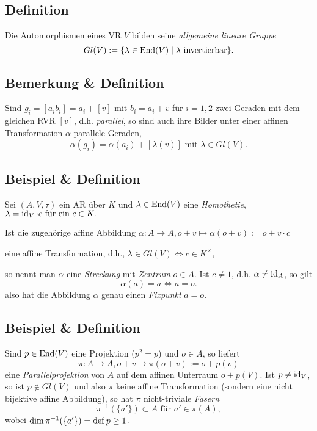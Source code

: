 \subsection{Definition}
	\begin{Definition}
	Die Automorphismen eines VR $ V $ bilden seine \emph{allgemeine lineare Gruppe}
		\[ Gl(V):= \{\lambda\in \operatorname{End}(V)\mid \lambda \text{ invertierbar}\}. \]
	\end{Definition}
\subsection{Bemerkung \& Definition}
	\begin{Definition}
	Sind $ g_i = [a_ib_i]=a_i + [v] $ mit $ b_i = a_i + v $ für $ i = 1,2 $ zwei Geraden mit dem gleichen RVR $ [v] $, d.h. \emph{parallel}, so sind auch ihre Bilder unter einer affinen Transformation $ \alpha $ parallele Geraden,
		\[ \alpha(g_i) = \alpha(a_i) + [\lambda(v)] \text{ mit } \lambda\in Gl(V). \]
	\end{Definition}
\subsection{Beispiel \& Definition}
	\begin{Definition}[Streckung]
	Sei $ (A,V,\tau) $ ein AR über $ K $ und $ \lambda\in\operatorname{End}(V) $ eine \emph{Homothetie},\hfill
		$ \lambda= \operatorname{id}_V\cdot c \text{ für ein }c\in K. $
		
	Ist die zugehörige affine Abbildung\hfill
		$ \alpha:A\to A,o+v\mapsto \alpha(o+v):= o+v\cdot c $
		
	eine affine Transformation, d.h.,\hfill
		$ \lambda \in Gl(V)\Leftrightarrow c\in K^\times, $
	
	so nennt man $ \alpha $ eine \emph{Streckung} mit \emph{Zentrum} $ o\in A $. Ist $ c\neq 1 $, d.h. $ \alpha \neq \operatorname{id}_A $, so gilt 
		\[ \alpha(a) = a\Leftrightarrow a = o. \]
	also hat die Abbildung $ \alpha $ genau einen \emph{Fixpunkt} $ a = o $.
	\end{Definition}
\subsection{Beispiel \& Definition}
	\begin{Definition}[Parallelprojektion]
	Sind $ p\in \operatorname{End}(V) $ eine Projektion ($ p^2 = p $) und $ o\in A $, so liefert
		\[ \pi:A\to A,o+v\mapsto \pi(o+v):= o+p(v) \]
	eine \emph{Parallelprojektion} von $ A $ auf dem affinen Unterraum $ o+p(V) $. Ist $ p\neq \operatorname{id}_V $, so ist $ p\notin Gl(V) $ und also $ \pi $ keine affine Transformation (sondern eine nicht bijektive affine Abbildung), so hat $ \pi $ nicht-triviale \emph{Fasern} 
		\[ \pi^{-1}(\{a'\})\subset A \text{ für } a'\in \pi(A), \]
	wobei $ \dim\pi^{-1}(\{a'\}) = \operatorname{def} p \geq 1 $.
	\end{Definition}

